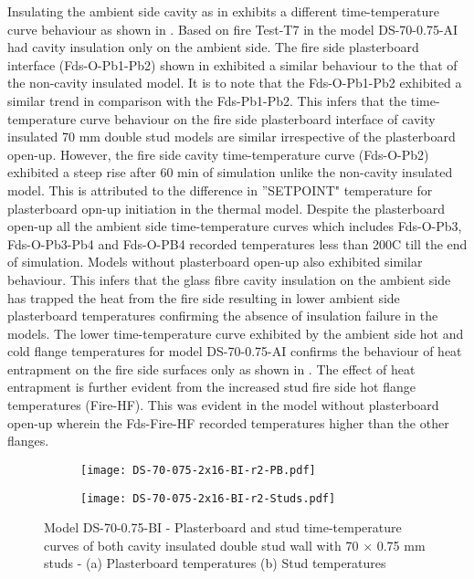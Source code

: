 Insulating the ambient side cavity as in  exhibits a different time-temperature curve behaviour as shown in . Based on fire Test-T7 in  the model DS-70-0.75-AI had cavity insulation only on the ambient side. The fire side plasterboard interface (Fds-O-Pb1-Pb2) shown in  exhibited a similar behaviour to the that of the non-cavity insulated model. It is to note that the Fds-O-Pb1-Pb2 exhibited a similar trend in comparison with the Fds-Pb1-Pb2. This infers that the time-temperature curve behaviour on the fire side plasterboard interface of cavity insulated 70 mm double stud models are similar irrespective of the plasterboard open-up. However, the fire side cavity time-temperature curve (Fds-O-Pb2) exhibited a steep rise after 60 min of simulation unlike the non-cavity insulated model. This is attributed to the difference in ''SETPOINT" temperature for plasterboard opn-up initiation in the thermal model. Despite the plasterboard open-up all the ambient side time-temperature curves which includes Fds-O-Pb3, Fds-O-Pb3-Pb4 and Fds-O-PB4 recorded temperatures less than 200\degree C till the end of simulation. Models without plasterboard open-up also exhibited similar behaviour. This infers that the glass fibre cavity insulation on the ambient side has trapped the heat from the fire side resulting in lower ambient side plasterboard temperatures confirming the absence of insulation failure in the models. The lower time-temperature curve exhibited by the ambient side hot and cold flange temperatures for model DS-70-0.75-AI confirms the behaviour of heat entrapment on the fire side surfaces only as shown in . The effect of heat entrapment is further evident from the increased stud fire side hot flange temperatures (Fire-HF). This was evident in the model without plasterboard open-up wherein the Fds-Fire-HF recorded temperatures higher than the other flanges.
\begin{figure}[!htbp]
	\centering
	\begin{subfigure}[b]{0.6\textwidth}
		\centering
		\texttt{[image: DS-70-075-2x16-BI-r2-PB.pdf]}
		\caption{}
		\label{subfig:DS-70-075-2x16-BI-r2-PB}
	\end{subfigure}
	\begin{subfigure}[b]{0.6\textwidth}
		\centering
		\texttt{[image: DS-70-075-2x16-BI-r2-Studs.pdf]}
		\caption{}
		\label{subfig:DS-70-075-2x16-BI-r2-Studs}
	\end{subfigure}
	   \caption{Model DS-70-0.75-BI - Plasterboard and stud time-temperature curves of both cavity insulated double stud wall with 70 $\times$ 0.75 mm studs - (a) Plasterboard temperatures (b) Stud temperatures}
	   \label{fig:DS-70-075-2x16-BI-r2}
\end{figure} 

